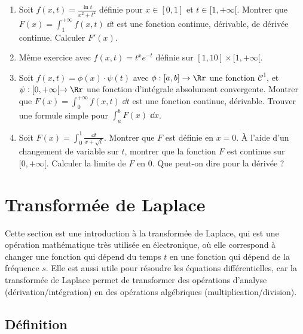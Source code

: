 \documentclass[class=report,crop=false]{standalone}
\begin{document}
\begin{miniexercices}
\begin{enumerate}
  \item Soit $f(x,t) = \frac{\ln t}{x^2+t^2}$ définie pour $x\in[0,1]$ et $t\in[1,+\infty[$.
  Montrer que $F(x) = \int_1^{+\infty} f(x,t)\;\dd t$ est une fonction continue, dérivable, 
  de dérivée continue. Calculer $F'(x)$.
  
  \item Même exercice avec $f(x,t) = t^x e^{-t}$ définie sur $[1,10]\times [1,+\infty[$.
  
  \item Soit $f(x,t) = \phi(x)\cdot\psi(t)$ avec $\phi : [a,b] \to \Rr$ une fonction  $\mathcal{C}^1$,
  et $\psi : [0,+\infty[ \to \Rr$ une fonction d'intégrale absolument convergente.
  Montrer que $F(x) = \int_0^{+\infty} f(x,t)\;\dd t$ est une fonction continue, dérivable.
  Trouver une formule simple pour $\int_a^b F(x) \;\dd x$.
  
  \item Soit $F(x) = \int_0^1 \frac{\dd t}{x+\sqrt{t}}$.
  Montrer que $F$ est définie en $x=0$. \`A l'aide d'un changement de variable sur $t$, montrer 
  que la fonction $F$ est continue sur $[0,+\infty[$. Calculer la limite de $F$ en $0$.
  Que peut-on dire pour la dérivée ?
\end{enumerate}
\end{miniexercices}




\section{Transformée de Laplace}

Cette section est une introduction à la transformée de Laplace, 
qui est une opération mathématique très utilisée en électronique,
où elle correspond à changer une fonction qui dépend du temps $t$ en une fonction
qui dépend de la fréquence $s$. Elle est aussi  utile
pour résoudre les équations différentielles, car la transformée de Laplace 
permet de transformer des opérations d'analyse (dérivation/intégration) en des 
opérations algébriques (multiplication/division).

\subsection{Définition}
\end{document}
